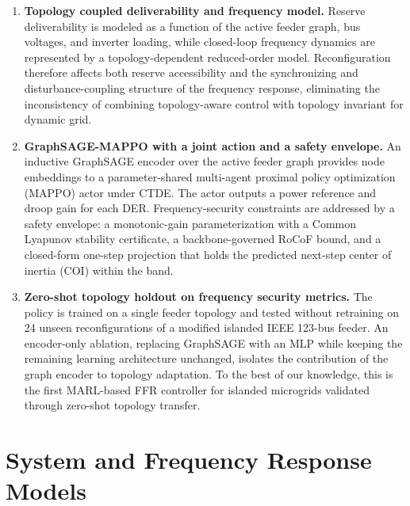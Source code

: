 \documentclass[lettersize,journal]{IEEEtran}
\begin{document}
	\begin{enumerate}[leftmargin=*]
		\item \textbf{Topology coupled deliverability and frequency model.}  Reserve deliverability is modeled as a function of the active feeder graph, bus voltages, and inverter loading, while closed-loop frequency dynamics are represented by a topology-dependent reduced-order model. Reconfiguration therefore affects both reserve accessibility and the synchronizing and disturbance-coupling structure of the frequency response, eliminating the inconsistency of combining topology-aware control with topology invariant for dynamic grid.
		
		\item \textbf{GraphSAGE-MAPPO with a joint action and a safety envelope.} An inductive GraphSAGE encoder over the active feeder graph provides node embeddings to a parameter-shared multi-agent proximal policy optimization (MAPPO) actor under CTDE. The actor outputs a power reference and droop gain for each DER. Frequency-security constraints are addressed by a safety envelope: a monotonic-gain parameterization with a Common Lyapunov stability certificate, a backbone-governed RoCoF bound, and a closed-form one-step projection that holds the predicted next-step center of inertia (COI) within the band.
		
		
		
		\item \textbf{Zero-shot topology holdout on frequency security metrics.} The policy is trained on a single feeder topology and tested without retraining on 24 unseen reconfigurations of a modified islanded IEEE 123-bus feeder. An encoder-only ablation, replacing GraphSAGE with an MLP while keeping the remaining learning architecture unchanged, isolates the contribution of the graph encoder to topology adaptation. To the best of our knowledge, this is the first MARL-based FFR controller for islanded microgrids validated through zero-shot topology transfer.
	\end{enumerate}
	
	\section{System and Frequency Response Models}
	\label{sec:model}
\end{document}

